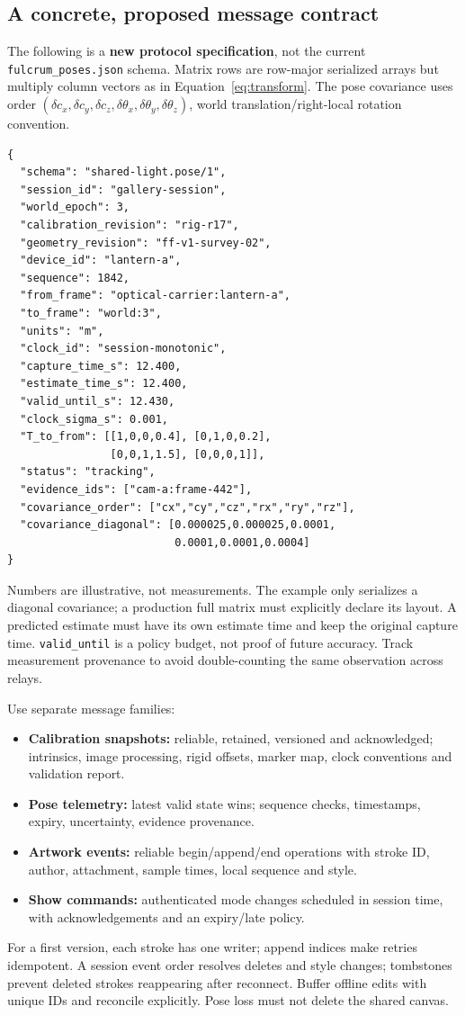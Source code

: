 \documentclass[11pt,a4paper]{article}
\begin{document}
\subsection{A concrete, proposed message contract}
The following is a \textbf{new protocol specification}, not the current
\texttt{fulcrum\_poses.json} schema. Matrix rows are row-major serialized
arrays but multiply column vectors as in Equation~\eqref{eq:transform}.
The pose covariance uses order $(\delta c_x,\delta c_y,\delta c_z,
\delta\theta_x,\delta\theta_y,\delta\theta_z)$, world translation/right-local
rotation convention.
\begin{lstlisting}
{
  "schema": "shared-light.pose/1",
  "session_id": "gallery-session",
  "world_epoch": 3,
  "calibration_revision": "rig-r17",
  "geometry_revision": "ff-v1-survey-02",
  "device_id": "lantern-a",
  "sequence": 1842,
  "from_frame": "optical-carrier:lantern-a",
  "to_frame": "world:3",
  "units": "m",
  "clock_id": "session-monotonic",
  "capture_time_s": 12.400,
  "estimate_time_s": 12.400,
  "valid_until_s": 12.430,
  "clock_sigma_s": 0.001,
  "T_to_from": [[1,0,0,0.4], [0,1,0,0.2],
                [0,0,1,1.5], [0,0,0,1]],
  "status": "tracking",
  "evidence_ids": ["cam-a:frame-442"],
  "covariance_order": ["cx","cy","cz","rx","ry","rz"],
  "covariance_diagonal": [0.000025,0.000025,0.0001,
                          0.0001,0.0001,0.0004]
}
\end{lstlisting}
Numbers are illustrative, not measurements. The example only serializes a
diagonal covariance; a production full matrix must explicitly declare its
layout. A predicted estimate must have its own estimate time and keep the
original capture time. \texttt{valid\_until} is a policy budget, not proof of
future accuracy. Track measurement provenance to avoid double-counting
the same observation across relays.

Use separate message families:
\begin{itemize}
  \item \textbf{Calibration snapshots:} reliable, retained, versioned and
    acknowledged; intrinsics, image processing, rigid offsets, marker map,
    clock conventions and validation report.
  \item \textbf{Pose telemetry:} latest valid state wins; sequence checks,
    timestamps, expiry, uncertainty, evidence provenance.
  \item \textbf{Artwork events:} reliable begin/append/end operations with
    stroke ID, author, attachment, sample times, local sequence and style.
  \item \textbf{Show commands:} authenticated mode changes scheduled in
    session time, with acknowledgements and an expiry/late policy.
\end{itemize}
For a first version, each stroke has one writer; append indices make retries
idempotent. A session event order resolves deletes and style changes;
tombstones prevent deleted strokes reappearing after reconnect.
Buffer offline edits with unique IDs and reconcile explicitly. Pose loss
must not delete the shared canvas.
\end{document}
